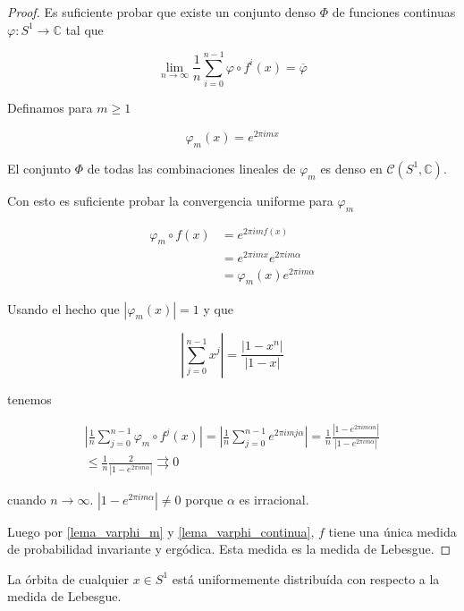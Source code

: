\begin{proof}
	Es suficiente probar que existe un conjunto denso $\Phi$ de funciones continuas $\varphi: S^1 \rightarrow \mathbb{C}$ tal que
	
	\begin{equation}
		\lim_{n \rightarrow \infty} \frac{1}{n} \sum_{i=0}^{n-1} \varphi \circ f^i(x) = \overline{\varphi}
	\end{equation}
	
	Definamos para $m \geq 1$
	
	\begin{equation}
		\varphi_m(x) = e^{2\pi imx}
	\end{equation}
	
	El conjunto $\Phi$ de todas las combinaciones lineales de $\varphi_m$ es denso en $\mathcal{C}(S^1,\mathbb{C})$.
	
	Con esto es suficiente probar la convergencia uniforme para $\varphi_m$
	
	\begin{align}
		\varphi_m \circ f(x) &= e^{2\pi imf(x)}\\
		&= e^{2\pi imx} e^{2\pi im\alpha}\\
		&= \varphi_m(x) e^{2\pi im\alpha}
	\end{align}
	
	Usando el hecho que $|\varphi_m(x)|=1$ y que
	
	\begin{equation}
		\left| \sum_{j=0}^{n-1} x^j \right| = \frac{|1-x^n|}{|1-x|}
	\end{equation}
	
	tenemos
	
	\begin{multline}
		\left| \frac{1}{n} \sum_{j=0}^{n-1} \varphi_m \circ f^j(x) \right| = \left| \frac{1}{n} \sum_{j=0}^{n-1} e^{2\pi imj\alpha} \right| = \frac{1}{n} \frac{|1-e^{2\pi im\alpha n}|}{|1-e^{2\pi im\alpha}|}\\
		\leq \frac{1}{n} \frac{2}{|1-e^{2\pi im\alpha}|}
		\rightrightarrows 0
	\end{multline}
	
	cuando $n \rightarrow \infty$. $|1-e^{2\pi im\alpha}| \neq 0$ porque $\alpha$ es irracional.
	
	Luego por \ref{lema_varphi_m} y \ref{lema_varphi_continua}, $f$ tiene una única medida de probabilidad invariante y ergódica. Esta medida es la medida de Lebesgue.
\end{proof}

\begin{teorema}\label{dist_uniforme}
  La órbita de cualquier $ x \in S^1 $ está uniformemente distribuída con respecto a la medida de Lebesgue.
\end{teorema}

